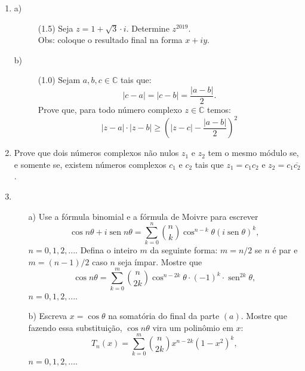 \documentclass[12pt,reqno]{article}
\numberwithin{equation}{section}
\begin{document}
 \begin{enumerate}
\item \begin{description} 
\item[a)] (1.5) Seja $z=1+\sqrt{3}\cdot i$. 
Determine  $z^{2019}$. \\
{\small Obs: coloque o resultado final na forma $x+iy$.}


\item[b)] (1.0) Sejam $a,b,c \in \mathbb C$ tais que:
\[|c-a| = |c-b| = \frac{|a-b|}{2}.\]
Prove que, para todo n\'umero complexo $z\in \mathbb C$ temos:
\[|z-a| \cdot |z-b| \geq \left(|z-c| - \frac{|a-b|}{2} \right)^2\]

\end{description}



\item Prove que dois n\'umeros complexos n\~ao nulos $z_1$ e $z_2$ tem o mesmo m\'odulo se, e somente se, existem n\'umeros complexos $c_1$ e $c_2$ tais que $z_1 = c_1c_2$ e $z_2=c_1\overline{c_2}$.


\item \begin{itemize}
\item[a)] Use a f\'ormula binomial e a f\'ormula de Moivre para escrever
\[\cos n\theta +i\operatorname{sen} n\theta = \sum_{k=0}^{n}\binom{n}{k}\cos^{n-k}\theta(i \operatorname{sen}\theta)^k, \]
$n=0,1,2,...$.
Defina o inteiro $m$ da seguinte forma: $m=n/2$ se $n$ \'e par e $m=(n-1)/2$ caso $n$ seja \'impar. Mostre que
\[\cos n\theta = \sum_{k=0}^{m}\binom{n}{2k}\cos^{n-2k}\theta \cdot (-1)^k\cdot \operatorname{sen}^{2k}\theta,\]
$n=0,1,2,...$.

\item[b)] Escreva $x= \cos \theta$ na somat\'oria do final da parte $(a)$. Mostre que fazendo essa substitui\c c\~ao, $\cos n \theta$ vira um polin\^omio em $x$:
\[T_n(x) = \sum_{k=0}^{m}\binom{n}{2k}x^{n-2k}(1-x^2)^{k},\]
$n=0,1,2,...$. 
\end{itemize}




\end{enumerate}

 
\end{document}
